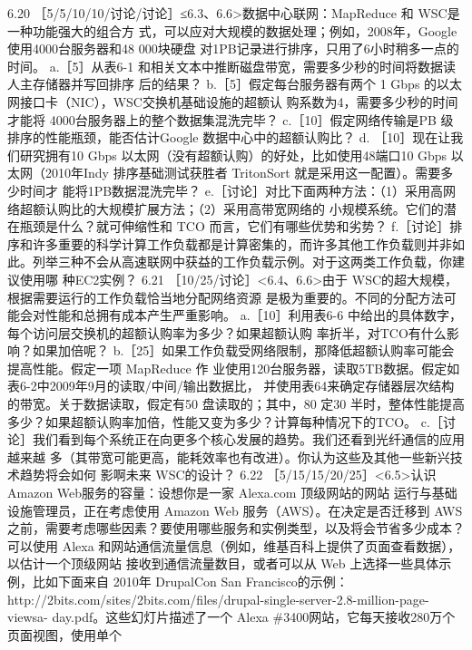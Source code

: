 6.20
［5/5/10/10/讨论/讨论］≤6.3、6.6>数据中心联网：MapReduce 和 WSC是一种功能强大的组合方
式，可以应对大规模的数据处理；例如，2008年，Google 使用4000台服务器和48 000块硬盘
对1PB记录进行排序，只用了6小时稍多一点的时间。
a.［5］从表6-1 和相关文本中推断磁盘带宽，需要多少秒的时间将数据读人主存储器并写回排序
后的结果？
b.［5］假定每台服务器有两个 1 Gbps 的以太网接口卡（NIC），WSC交换机基础设施的超额认
购系数为4，需要多少秒的时间才能将 4000台服务器上的整个数据集混洗完毕？
c.［10］假定网络传输是PB 级排序的性能瓶颈，能否估计Google 数据中心中的超额认购比？
d. ［10］现在让我们研究拥有10 Gbps 以太网（没有超额认购）的好处，比如使用48端口10 Gbps
以太网（2010年Indy 排序基础测试获胜者 TritonSort 就是采用这一配置）。需要多少时间才
能将1PB数据混洗完毕？
e.［讨论］对比下面两种方法：（1）采用高网络超额认购比的大规模扩展方法；（2）采用高带宽网络的
小规模系统。它们的潜在瓶颈是什么？就可伸缩性和 TCO 而言，它们有哪些优势和劣势？
f.［讨论］排序和许多重要的科学计算工作负载都是计算密集的，而许多其他工作负载则并非如
此。列举三种不会从高速联网中获益的工作负载示例。对于这两类工作负载，你建议使用哪
种EC2实例？
6.21 ［10/25/讨论］<6.4、6.6>由于 WSC的超大规模，根据需要运行的工作负载恰当地分配网络资源
是极为重要的。不同的分配方法可能会对性能和总拥有成本产生严重影响。
a.［10］利用表6-6 中给出的具体数字，每个访问层交换机的超额认购率为多少？如果超额认购
率折半，对TCO有什么影响？如果加倍呢？
b.［25］如果工作负载受网络限制，那降低超额认购率可能会提高性能。假定一项 MapReduce 作
业使用120台服务器，读取5TB数据。假定如表6-2中2009年9月的读取/中间/输出数据比，
并使用表64来确定存储器层次结构的带宽。关于数据读取，假定有50%
盘读取的；其中，80%
定30%
半时，整体性能提高多少？如果超额认购率加倍，性能又变为多少？计算每种情况下的TCO。
c.［讨论］我们看到每个系统正在向更多个核心发展的趋势。我们还看到光纤通信的应用越来越
多（其带宽可能更高，能耗效率也有改进）。你认为这些及其他一些新兴技术趋势将会如何
影啊未来 WSC的设计？
6.22 ［5/15/15/20/25］<6.5>认识 Amazon Web服务的容量：设想你是一家 Alexa.com 顶级网站的网站
运行与基础设施管理员，正在考虑使用 Amazon Web 服务（AWS）。在决定是否迁移到 AWS
之前，需要考虑哪些因素？要使用哪些服务和实例类型，以及将会节省多少成本？可以使用
Alexa 和网站通信流量信息（例如，维基百科上提供了页面查看数据），以估计一个顶级网站
接收到通信流量数目，或者可以从 Web 上选择一些具体示例，比如下面来自 2010年 DrupalCon
San Francisco的示例：http://2bits.com/sites/2bits.com/files/drupal-single-server-2.8-million-page-viewsa-
day.pdf。这些幻灯片描述了一个 Alexa \#3400网站，它每天接收280万个页面视图，使用单个
